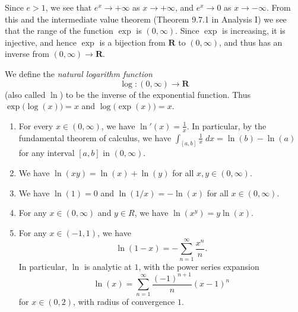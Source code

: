 \begin{note}
    Since \(e > 1\), we see that \(e^x \to +\infty\) as \(x \to +\infty\), and \(e^x \to 0\) as \(x \to -\infty\).
    From this and the intermediate value theorem (Theorem 9.7.1 in Analysis I) we see that the range of the function \(\exp\) is \((0, \infty)\).
    Since \(\exp\) is increasing, it is injective, and hence \(\exp\) is a bijection from \(\mathbf{R}\) to \((0, \infty)\), and thus has an inverse from \((0, \infty) \to \mathbf{R}\).
\end{note}

\begin{definition}[Logarithm]\label{4.5.5}
    We define the \emph{natural logarithm function}
    \[
        \log : (0, \infty) \to \mathbf{R}
    \]
    (also called \(\ln\)) to be the inverse of the exponential function.
    Thus \(\exp\big(\log(x)\big) = x\) and \(\log\big(\exp(x)\big) = x\).
\end{definition}

\begin{theorem}\label{4.5.6}
    \quad
    \begin{enumerate}
        \item For every \(x \in (0, \infty)\), we have \(\ln'(x) = \frac{1}{x}\).
              In particular, by the fundamental theorem of calculus, we have \(\int_{[a, b]} \frac{1}{x} \; dx = \ln(b) - \ln(a)\) for any interval \([a, b]\) in \((0, \infty)\).
        \item We have \(\ln(xy) = \ln(x) + \ln(y)\) for all \(x, y \in (0, \infty)\).
        \item We have \(\ln(1) = 0\) and \(\ln(1 / x) = -\ln(x)\) for all \(x \in (0, \infty)\).
        \item For any \(x \in (0, \infty)\) and \(y \in R\), we have \(\ln(x^y) = y \ln(x)\).
        \item For any \(x \in (-1, 1)\), we have
              \[
                  \ln(1 - x) = - \sum_{n = 1}^\infty \frac{x^n}{n}.
              \]
              In particular, \(\ln\) is analytic at \(1\), with the power series expansion
              \[
                  \ln(x) = \sum_{n = 1}^\infty \frac{(-1)^{n + 1}}{n} (x - 1)^n
              \]
              for \(x \in (0, 2)\), with radius of convergence \(1\).
    \end{enumerate}
\end{theorem}

